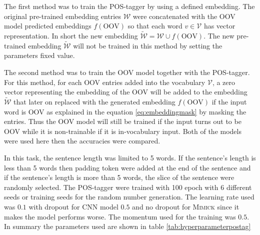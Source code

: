         The first method was to train the POS-tagger by using a
        defined embedding. The original pre-trained embedding entries
        $\mathcal{W}$ were concatenated with the OOV model predicted
        embeddings $f(\text{OOV})$ so that each word $v \in
        \mathcal{V}$ has vector representation. In short the new
        embedding $\mathcal{\tilde{W}} = \mathcal{W} \cup
        f(\text{OOV})$. The new pre-trained embedding
        $\mathcal{\tilde{W}}$ will not be trained in this method by
        setting the parameters fixed value.
        
        The second method was to train the OOV model together with the
        POS-tagger. For this method, for each OOV entries added into
        the vocabulary $\mathcal{V}$, a zero vector representing the
        embedding of the OOV will be added to the embedding
        $\mathcal{\tilde{W}}$ that later on replaced with the
        generated embedding $f(\text{OOV})$ if the input word is OOV
        as explained in the equation \ref{eq:embeddingmask} by masking
        the entries. Thus the OOV model will still be trained if the
        input turns out to be OOV while it is non-trainable if it is
        in-vocabulary input. Both of the models were used here then
        the accuracies were compared.

        In this task, the sentence length was limited to 5 words. If
        the sentence's length is less than 5 words then padding token
        were added at the end of the sentence and if the sentence's
        length is more than 5 words, the slice of the sentence were
        randomly selected. The POS-tagger were trained with 100 epoch
        with 6 different seeds or training seeds for the random number
        generation. The learning rate used was $0.1$ with dropout for
        CNN model $0.5$ and no dropout for \textsc{Mimick} since it
        makes the model performs worse. The momentum used for the
        training was $0.5$. In summary the parameters used are shown
        in table \ref{tab:hyperparameterpostag}

